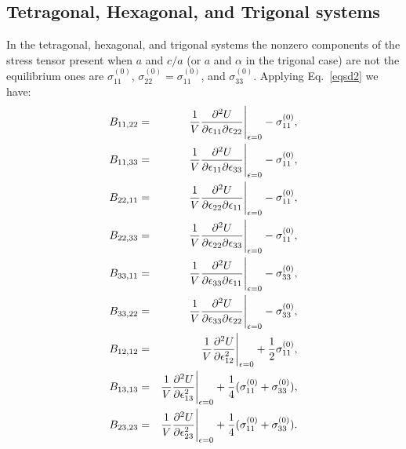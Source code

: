 \documentclass[12pt,a4paper]{article}
\begin{document}
\subsection{\color{web-blue}Tetragonal, Hexagonal, and Trigonal systems}
In the tetragonal, hexagonal, and trigonal systems the nonzero components 
of the stress tensor present when $a$ and $c/a$ (or $a$ and $\alpha$ in
the trigonal case) are not the equilibrium ones are
$\sigma^{(0)}_{11}$, $\sigma^{(0)}_{22}=\sigma^{(0)}_{11}$, and
$\sigma^{(0)}_{33}$.
Applying Eq.~\ref{eqsd2} we have:
\begin{eqnarray}
B_{11,22} &=& {1 \over V}{\partial^2 U \over \partial \epsilon_{11} 
\partial \epsilon_{22}}\Bigg|_{\epsilon=0} - \sigma^{(0)}_{11}, \\
B_{11,33} &=& {1 \over V}{\partial^2 U \over \partial \epsilon_{11} 
\partial \epsilon_{33}}\Bigg|_{\epsilon=0} - \sigma^{(0)}_{11}, \\
B_{22,11} &=& {1 \over V}{\partial^2 U \over \partial \epsilon_{22} 
\partial \epsilon_{11}}\Bigg|_{\epsilon=0} - \sigma^{(0)}_{11}, \\
B_{22,33} &=& {1 \over V}{\partial^2 U \over \partial \epsilon_{22} 
\partial \epsilon_{33}}\Bigg|_{\epsilon=0} - \sigma^{(0)}_{11}, \\
B_{33,11} &=& {1 \over V}{\partial^2 U \over \partial \epsilon_{33} 
\partial \epsilon_{11}}\Bigg|_{\epsilon=0} - \sigma^{(0)}_{33}, \\
B_{33,22} &=& {1 \over V}{\partial^2 U \over \partial \epsilon_{33} 
\partial \epsilon_{22}}\Bigg|_{\epsilon=0} - \sigma^{(0)}_{33}, \\
B_{12,12} &=& {1 \over V}{\partial^2 U \over \partial \epsilon_{12}^2 }\Bigg|_{\epsilon=0} + {1\over 2} \sigma^{(0)}_{11}, \\
B_{13,13} &=& {1 \over V}{\partial^2 U \over \partial \epsilon_{13}^2}\Bigg|_{\epsilon=0} + {1\over 4} (\sigma^{(0)}_{11}+\sigma^{(0)}_{33}), \\
B_{23,23} &=& {1 \over V}{\partial^2 U \over \partial \epsilon_{23}^2 }\Bigg|_{\epsilon=0} + {1\over 4} (\sigma^{(0)}_{11}+\sigma^{(0)}_{33}).
\end{eqnarray}
\end{document}

